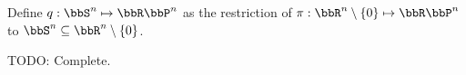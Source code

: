 Define $q:\bbS^n \mapsto \bbR\bbP^n$ as the restriction of $\pi:\bbR^n\setminus \{0\} \mapsto \bbR\bbP^n$ to $\bbS^n \subseteq \bbR^n\setminus \{0\}$.

TODO: Complete.